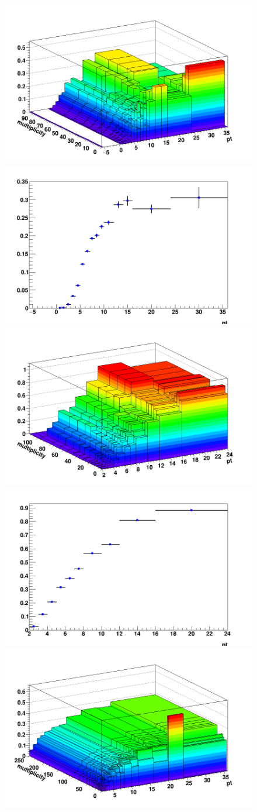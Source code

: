 \begin{figure}[h]   %
	\centering
	\includegraphics[width=.48\linewidth]{figures/Effs/EfficiencyMap_2D_DPlus_b_Ref_wLimAcc_Plot.png}
	\includegraphics[width=.48\linewidth]{figures/Effs/EfficiencyMap_1D_DPlus_b_Ref_wLimAcc_Plot.png}
	\includegraphics[width=.48\linewidth]{figures/DStar_pp/EfficiencyMap_2D_DStar_b_final_wLimAcc_Plot.png}
	\includegraphics[width=.48\linewidth]{figures/DStar_pp/EfficiencyMap_1D_DStar_b_final_wLimAcc_Plot.png}
	\includegraphics[width=.48\linewidth]{figures/Effs/EfficiencyMap_2D_Dzero_b_RefPtBins_wLimAcc_Plot.png}

\end{figure}
